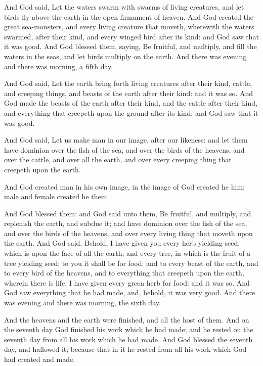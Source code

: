 And God said, Let the waters swarm with swarms of living creatures, and let birds fly above the earth in the open firmament of heaven. And God created the great sea-monsters, and every living creature that moveth, wherewith the waters swarmed, after their kind, and every winged bird after its kind: and God saw that it was good. And God blessed them, saying, Be fruitful, and multiply, and fill the waters in the seas, and let birds multiply on the earth. And there was evening and there was morning, a fifth day.  

And God said, Let the earth bring forth living creatures after their kind, cattle, and creeping things, and beasts of the earth after their kind: and it was so. And God made the beasts of the earth after their kind, and the cattle after their kind, and everything that creepeth upon the ground after its kind: and God saw that it was good. 

And God said, Let us make man in our image, after our likeness: and let them have dominion over the fish of the sea, and over the birds of the heavens, and over the cattle, and over all the earth, and over every creeping thing that creepeth upon the earth. 

And God created man in his own image, in the image of God created he him; male and female created he them. 

And God blessed them: and God said unto them, Be fruitful, and multiply, and replenish the earth, and subdue it; and have dominion over the fish of the sea, and over the birds of the heavens, and over every living thing that moveth upon the earth. And God said, Behold, I have given you every herb yielding seed, which is upon the face of all the earth, and every tree, in which is the fruit of a tree yielding seed; to you it shall be for food: and to every beast of the earth, and to every bird of the heavens, and to everything that creepeth upon the earth, wherein there is life, I have given every green herb for food: and it was so. And God saw everything that he had made, and, behold, it was very good. And there was evening and there was morning, the sixth day. 

And the heavens and the earth were finished, and all the host of them. And on the seventh day God finished his work which he had made; and he rested on the seventh day from all his work which he had made. And God blessed the seventh day, and hallowed it; because that in it he rested from all his work which God had created and made.  

